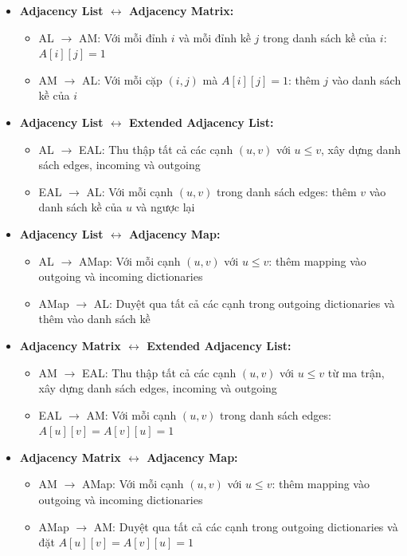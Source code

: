 \documentclass{article}
\begin{document}
\begin{itemize}
    \item \textbf{Adjacency List $\leftrightarrow$ Adjacency Matrix:}
    \begin{itemize}
        \item AL $\to$ AM: Với mỗi đỉnh $i$ và mỗi đỉnh kề $j$ trong danh sách kề của $i$: $A[i][j] = 1$
        \item AM $\to$ AL: Với mỗi cặp $(i,j)$ mà $A[i][j] = 1$: thêm $j$ vào danh sách kề của $i$
    \end{itemize}
    \item \textbf{Adjacency List $\leftrightarrow$ Extended Adjacency List:}
    \begin{itemize}
        \item AL $\to$ EAL: Thu thập tất cả các cạnh $(u,v)$ với $u \leq v$, xây dựng danh sách edges, incoming và outgoing
        \item EAL $\to$ AL: Với mỗi cạnh $(u,v)$ trong danh sách edges: thêm $v$ vào danh sách kề của $u$ và ngược lại
    \end{itemize}
    \item \textbf{Adjacency List $\leftrightarrow$ Adjacency Map:}
    \begin{itemize}
        \item AL $\to$ AMap: Với mỗi cạnh $(u,v)$ với $u \leq v$: thêm mapping vào outgoing và incoming dictionaries
        \item AMap $\to$ AL: Duyệt qua tất cả các cạnh trong outgoing dictionaries và thêm vào danh sách kề
    \end{itemize}
    \item \textbf{Adjacency Matrix $\leftrightarrow$ Extended Adjacency List:}
    \begin{itemize}
        \item AM $\to$ EAL: Thu thập tất cả các cạnh $(u,v)$ với $u \leq v$ từ ma trận, xây dựng danh sách edges, incoming và outgoing
        \item EAL $\to$ AM: Với mỗi cạnh $(u,v)$ trong danh sách edges: $A[u][v] = A[v][u] = 1$
    \end{itemize}
    \item \textbf{Adjacency Matrix $\leftrightarrow$ Adjacency Map:}
    \begin{itemize}
        \item AM $\to$ AMap: Với mỗi cạnh $(u,v)$ với $u \leq v$: thêm mapping vào outgoing và incoming dictionaries
        \item AMap $\to$ AM: Duyệt qua tất cả các cạnh trong outgoing dictionaries và đặt $A[u][v] = A[v][u] = 1$

\end{itemize}
\end{itemize}
\end{document}
